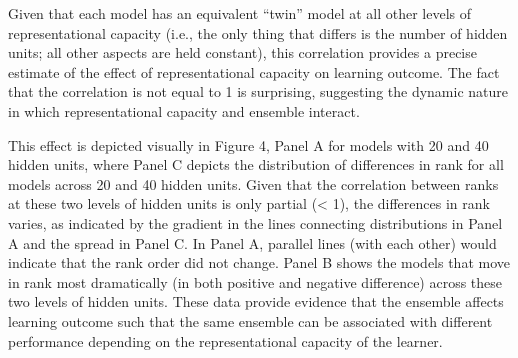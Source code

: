 \documentclass[
  ,man,floatsintext]{apa6}
\begin{document}
Given that each model has an equivalent ``twin'' model at all other levels of representational capacity (i.e., the only thing that differs is the number of hidden units; all other aspects are held constant), this correlation provides a precise estimate of the effect of representational capacity on learning outcome. The fact that the correlation is not equal to 1 is surprising, suggesting the dynamic nature in which representational capacity and ensemble interact.

This effect is depicted visually in Figure 4, Panel A for models with 20 and 40 hidden units, where Panel C depicts the distribution of differences in rank for all models across 20 and 40 hidden units. Given that the correlation between ranks at these two levels of hidden units is only partial (\textless{} 1), the differences in rank varies, as indicated by the gradient in the lines connecting distributions in Panel A and the spread in Panel C. In Panel A, parallel lines (with each other) would indicate that the rank order did not change. Panel B shows the models that move in rank most dramatically (in both positive and negative difference) across these two levels of hidden units. These data provide evidence that the ensemble affects learning outcome such that the same ensemble can be associated with different performance depending on the representational capacity of the learner.
\end{document}
